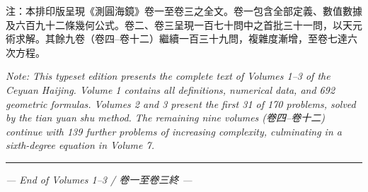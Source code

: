 \documentclass[11pt,a4paper]{article}
\newlength{\chwidth}
\newlength{\enwidth}
\newcommand{\zh}[1]{{\CJKfamily{sf}#1}}
\newenvironment{bilingual}{%
  \noindent
  \begin{minipage}[t]{\chwidth}%
  \small
}{%
  \end{minipage}%
}
\newcommand{\switchcolumn}{%
  \end{minipage}%
  \hfill%
  \begin{minipage}[t]{\enwidth}%
  \small
}
\begin{document}
\begin{bilingual}
\zh{注：本排印版呈現《測圓海鏡》卷一至卷三之全文。卷一包含全部定義、數值數據及六百九十二條幾何公式。卷二、卷三呈現一百七十問中之首批三十一問，以天元術求解。其餘九卷（卷四--卷十二）繼續一百三十九問，複雜度漸增，至卷七達六次方程。}

\switchcolumn

\textit{Note: This typeset edition presents the complete text of Volumes 1--3 of the {\itshape Ceyuan Haijing}. Volume 1 contains all definitions, numerical data, and 692 geometric formulas. Volumes 2 and 3 present the first 31 of 170 problems, solved by the tian yuan shu method. The remaining nine volumes (卷四--卷十二) continue with 139 further problems of increasing complexity, culminating in a sixth-degree equation in Volume 7.}
\end{bilingual}

\vspace{1cm}

\begin{center}
{\color{rulecolor}\rule{0.5\textwidth}{0.4pt}}

\vspace{0.5cm}

{\small\textit{--- End of Volumes 1--3 / 卷一至卷三終 ---}}
\end{center}
\end{document}
